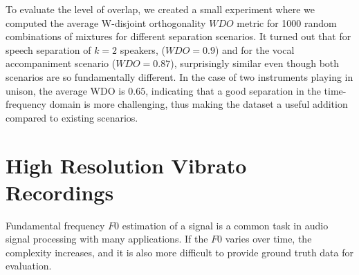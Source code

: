 To evaluate the level of overlap, we created a small experiment where we computed the average W-disjoint orthogonality \(WDO\) metric for 1000 random combinations of mixtures for different separation scenarios.
It turned out that for speech separation of \(k=2\) speakers, (\(WDO=0.9\)) and for the vocal accompaniment scenario (\(WDO=0.87\)), surprisingly similar even though both scenarios are so fundamentally different.
In the case of two instruments playing in unison, the average WDO is \(0.65\), indicating that a good separation in the time-frequency domain is more challenging, thus making the dataset a useful addition compared to existing scenarios.


\section{High Resolution Vibrato Recordings}%
\label{sec:muserc}

Fundamental frequency \(F0\) estimation of a signal is a common task in audio signal processing with many applications. 
If the $F0$ varies over time, the complexity increases, and it is also more difficult to provide ground truth data for evaluation.

